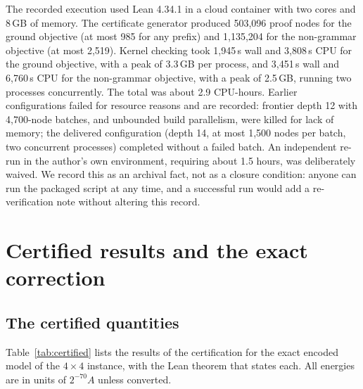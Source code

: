 \documentclass[11pt,a4paper]{article}
\theoremstyle{plain}
\theoremstyle{definition}
\theoremstyle{remark}
\begin{document}
The recorded execution used Lean 4.34.1 in a cloud container with two cores and 8\,GB of memory. The certificate generator produced 503{,}096 proof nodes for the ground objective (at most 985 for any prefix) and 1{,}135{,}204 for the non-grammar objective (at most 2{,}519). Kernel checking took 1{,}945\,s wall and 3{,}808\,s CPU for the ground objective, with a peak of 3.3\,GB per process, and 3{,}451\,s wall and 6{,}760\,s CPU for the non-grammar objective, with a peak of 2.5\,GB, running two processes concurrently. The total was about 2.9 CPU-hours. Earlier configurations failed for resource reasons and are recorded: frontier depth 12 with 4{,}700-node batches, and unbounded build parallelism, were killed for lack of memory; the delivered configuration (depth 14, at most 1{,}500 nodes per batch, two concurrent processes) completed without a failed batch. An independent re-run in the author's own environment, requiring about 1.5 hours, was deliberately waived. We record this as an archival fact, not as a closure condition: anyone can run the packaged script at any time, and a successful run would add a re-verification note without altering this record.

\section{Certified results and the exact correction}\label{sec:results}

\subsection{The certified quantities}
Table~\ref{tab:certified} lists the results of the certification for the exact encoded model of the $4\times4$ instance, with the Lean theorem that states each. All energies are in units of $2^{-70}A$ unless converted.
\end{document}
